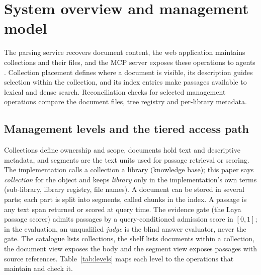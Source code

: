 \section{System overview and management model}
\label{sec:system}

The parsing service recovers document content, the web application
maintains collections and their files, and the MCP server exposes these
operations to agents \cite{mcp}. Collection placement defines where a
document is visible, its description guides selection within the
collection, and
its index entries make passages available to lexical and dense search.
Reconciliation checks for selected management operations compare the
document files, tree registry and per-library metadata.

\subsection{Management levels and the tiered access path}
\label{sec:levels}

Collections define ownership and scope, documents hold text and
descriptive metadata, and segments are the text units used for passage
retrieval or scoring. The implementation calls a collection a library
(knowledge base); this paper says \emph{collection} for the object and
keeps \emph{library} only in the implementation's own terms (sub-library,
library registry, file names). A document can be stored in several
parts; each part is split into segments, called chunks in the index. A
passage is any text span returned or scored at query time. The evidence
gate (the Laya passage scorer) admits passages by a query-conditioned
admission score in $[0,1]$; in the evaluation, an unqualified
\emph{judge} is the blind answer evaluator, never the gate. The catalogue lists collections, the shelf
lists documents within a collection, the document view exposes the body
and the segment view exposes passages with source references.
Table~\ref{tab:levels} maps each level to the operations that maintain and
check it.


